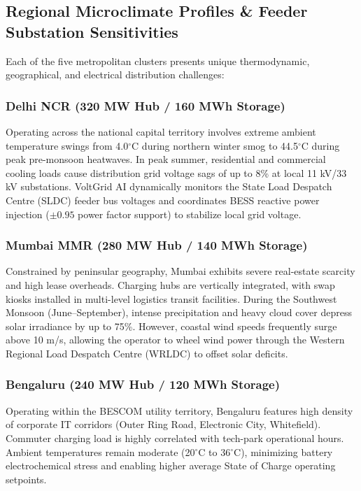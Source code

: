 \documentclass[10.5pt,a4paper]{article}
\begin{document}

\subsection{Regional Microclimate Profiles \& Feeder Substation Sensitivities}
Each of the five metropolitan clusters presents unique thermodynamic, geographical, and electrical distribution challenges:

\subsubsection{Delhi NCR (320 MW Hub / 160 MWh Storage)}
Operating across the national capital territory involves extreme ambient temperature swings from 4.0$^\circ$C during northern winter smog to 44.5$^\circ$C during peak pre-monsoon heatwaves. In peak summer, residential and commercial cooling loads cause distribution grid voltage sags of up to 8\% at local 11 kV/33 kV substations. VoltGrid AI dynamically monitors the State Load Despatch Centre (SLDC) feeder bus voltages and coordinates BESS reactive power injection ($\pm 0.95$ power factor support) to stabilize local grid voltage.

\subsubsection{Mumbai MMR (280 MW Hub / 140 MWh Storage)}
Constrained by peninsular geography, Mumbai exhibits severe real-estate scarcity and high lease overheads. Charging hubs are vertically integrated, with swap kiosks installed in multi-level logistics transit facilities. During the Southwest Monsoon (June--September), intense precipitation and heavy cloud cover depress solar irradiance by up to 75\%. However, coastal wind speeds frequently surge above 10 m/s, allowing the operator to wheel wind power through the Western Regional Load Despatch Centre (WRLDC) to offset solar deficits.

\subsubsection{Bengaluru (240 MW Hub / 120 MWh Storage)}
Operating within the BESCOM utility territory, Bengaluru features high density of corporate IT corridors (Outer Ring Road, Electronic City, Whitefield). Commuter charging load is highly correlated with tech-park operational hours. Ambient temperatures remain moderate (20$^\circ$C to 36$^\circ$C), minimizing battery electrochemical stress and enabling higher average State of Charge operating setpoints.
\end{document}
